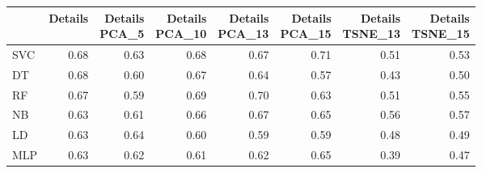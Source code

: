 \documentclass[12pt,italian]{report}
\begin{document}
\begin{table}[h]
	\begin{center}
		\begin{adjustbox}{max width=\textwidth, max totalheight= {4cm}}
			\begin{tabular}{lrrrrrrr}
				\toprule
				{} &   Details &  \thead{Details\\PCA\_5} & \thead{Details\\ PCA\_10} &  \thead{Details\\ PCA\_13} &  \thead{Details\\PCA\_15} &  \thead{Details\\TSNE\_13} &  \thead{Details\\TSNE\_15} \\
				\midrule
				SVC &  0.68 &                  0.63 &                   0.68 &                   0.67 &                   0.71 &                    0.51 &                    0.53 \\
				DT  &  \cellcolor{cyan}0.68 &                  0.60 &                   0.67 &                   0.64 &                   0.57 &                    0.43 &                    0.50 \\
				RF  &  0.67 &                  0.59 &                   0.69 &                   \cellcolor{cyan}0.70 &                   0.63 &                    0.51 &                    0.55 \\
				NB  &  0.63 &                  0.61 &                   0.66 &                   0.67 &                   0.65 &                    0.56 &                    0.57 \\
				LD  &  0.63 &                  0.64 &                   0.60 &                   0.59 &                   0.59 &                    0.48 &                    0.49 \\
				MLP &  0.63 &                  0.62 &                   0.61 &                   0.62 &                   0.65 &                    0.39 &                    0.47 \\
				\bottomrule
			\end{tabular}
		\end{adjustbox}
	\end{center}
\end{table}
\end{document}
